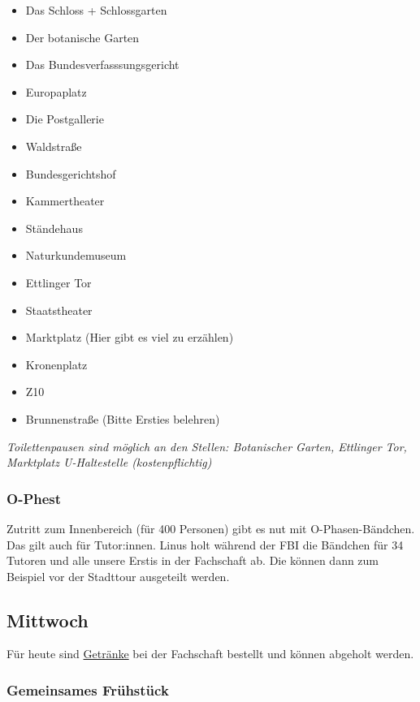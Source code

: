 \documentclass[10pt,ngerman]{scrartcl}
\begin{document}
\begin{multicols}{2}
\begin{itemize}
    \item Das Schloss + Schlossgarten
    \item Der botanische Garten
    \item Das Bundesverfasssungsgericht
    \item Europaplatz
    \item Die Postgallerie
    \item Waldstraße
    \item Bundesgerichtshof
    \item Kammertheater
    \item Ständehaus
    \item Naturkundemuseum
    \item Ettlinger Tor
    \item Staatstheater
    \item Marktplatz (Hier gibt es viel zu erzählen)
    \item Kronenplatz
    \item Z10
    \item Brunnenstraße (Bitte Ersties belehren)
\end{itemize}

\emph{Toilettenpausen sind möglich an den Stellen: Botanischer Garten, Ettlinger Tor, Marktplatz U-Haltestelle (kostenpflichtig)}

\subsubsection{O-Phest}

Zutritt zum Innenbereich (für 400 Personen) gibt es nut mit O-Phasen-Bändchen.
Das gilt auch für Tutor:innen.
Linus holt während der FBI die Bändchen für 34 Tutoren und alle unsere Erstis in der Fachschaft ab.
Die können dann zum Beispiel vor der Stadttour ausgeteilt werden.

\subsection{Mittwoch}

Für heute sind \hyperref[drinks]{Getränke} bei der Fachschaft bestellt und können abgeholt werden.

\subsubsection{Gemeinsames Frühstück}


\end{multicols}
\end{document}
